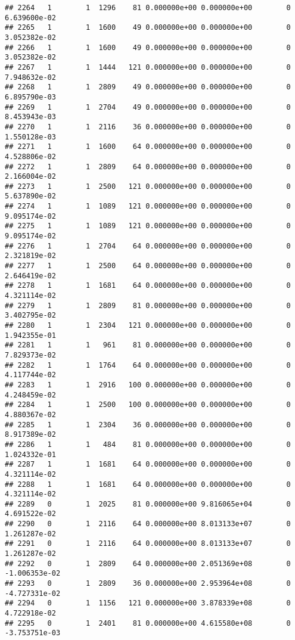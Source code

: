 \documentclass[
]{article}
\begin{document}
\begin{enumerate}
\begin{verbatim}
## 2264   1        1  1296    81 0.000000e+00 0.000000e+00        0  6.639600e-02
## 2265   1        1  1600    49 0.000000e+00 0.000000e+00        0  3.052382e-02
## 2266   1        1  1600    49 0.000000e+00 0.000000e+00        0  3.052382e-02
## 2267   1        1  1444   121 0.000000e+00 0.000000e+00        0  7.948632e-02
## 2268   1        1  2809    49 0.000000e+00 0.000000e+00        0  6.895790e-03
## 2269   1        1  2704    49 0.000000e+00 0.000000e+00        0  8.453943e-03
## 2270   1        1  2116    36 0.000000e+00 0.000000e+00        0  1.550128e-03
## 2271   1        1  1600    64 0.000000e+00 0.000000e+00        0  4.528806e-02
## 2272   1        1  2809    64 0.000000e+00 0.000000e+00        0  2.166004e-02
## 2273   1        1  2500   121 0.000000e+00 0.000000e+00        0  5.637890e-02
## 2274   1        1  1089   121 0.000000e+00 0.000000e+00        0  9.095174e-02
## 2275   1        1  1089   121 0.000000e+00 0.000000e+00        0  9.095174e-02
## 2276   1        1  2704    64 0.000000e+00 0.000000e+00        0  2.321819e-02
## 2277   1        1  2500    64 0.000000e+00 0.000000e+00        0  2.646419e-02
## 2278   1        1  1681    64 0.000000e+00 0.000000e+00        0  4.321114e-02
## 2279   1        1  2809    81 0.000000e+00 0.000000e+00        0  3.402795e-02
## 2280   1        1  2304   121 0.000000e+00 0.000000e+00        0  1.942355e-01
## 2281   1        1   961    81 0.000000e+00 0.000000e+00        0  7.829373e-02
## 2282   1        1  1764    64 0.000000e+00 0.000000e+00        0  4.117744e-02
## 2283   1        1  2916   100 0.000000e+00 0.000000e+00        0  4.248459e-02
## 2284   1        1  2500   100 0.000000e+00 0.000000e+00        0  4.880367e-02
## 2285   1        1  2304    36 0.000000e+00 0.000000e+00        0  8.917389e-02
## 2286   1        1   484    81 0.000000e+00 0.000000e+00        0  1.024332e-01
## 2287   1        1  1681    64 0.000000e+00 0.000000e+00        0  4.321114e-02
## 2288   1        1  1681    64 0.000000e+00 0.000000e+00        0  4.321114e-02
## 2289   0        1  2025    81 0.000000e+00 9.816065e+04        0  4.691522e-02
## 2290   0        1  2116    64 0.000000e+00 8.013133e+07        0  1.261287e-02
## 2291   0        1  2116    64 0.000000e+00 8.013133e+07        0  1.261287e-02
## 2292   0        1  2809    64 0.000000e+00 2.051369e+08        0 -1.006353e-02
## 2293   0        1  2809    36 0.000000e+00 2.953964e+08        0 -4.727331e-02
## 2294   0        1  1156   121 0.000000e+00 3.878339e+08        0  4.722918e-02
## 2295   0        1  2401    81 0.000000e+00 4.615580e+08        0 -3.753751e-03

\end{verbatim}
\end{enumerate}
\end{document}
